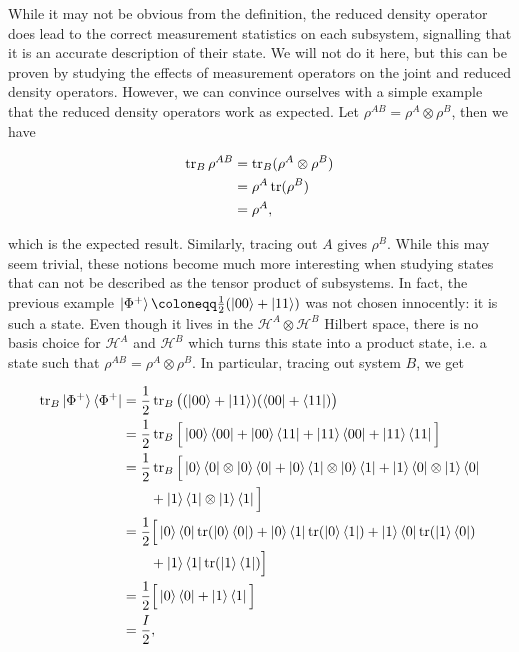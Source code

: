 While it may not be obvious from the definition, the reduced density operator does lead to the correct measurement statistics on each subsystem, signalling that it is an accurate description of their state. We will not do it here, but this can be proven by studying the effects of measurement operators on the joint and reduced density operators. However, we can convince ourselves with a simple example that the reduced density operators work as expected. Let $\rho^{AB} = \rho^A \otimes \rho^B$, then we have

\begin{align}
    \operatorname{tr}_B \rho^{AB} &= \operatorname{tr}_B (\rho^A \otimes \rho^B)\\
                    &= \rho^A \operatorname{tr}(\rho^B)\\
                    &= \rho^A,
\end{align}

\noindent which is the expected result. Similarly, tracing out $A$ gives $\rho^B$. While this may seem trivial, these notions become much more interesting when studying states that can not be described as the tensor product of subsystems. In fact, the previous example $\ket{\Phi^+} \coloneqq \frac{1}{2}(\ket{00} + \ket{11})$ was not chosen innocently: it is such a state. Even though it lives in the $\mathcal{H}^A \otimes \mathcal{H}^B$ Hilbert space, there is no basis choice for $\mathcal{H}^A$ and $\mathcal{H}^B$ which turns this state into a product state, i.e. a state such that $\rho^{AB} = \rho^A \otimes \rho^B$. In particular, tracing out system $B$, we get

\begin{align}
    \operatorname{tr}_B \ket{\Phi^+}\bra{\Phi^+} &= \frac{1}{2} \operatorname{tr}_B \big((\ket{00} + \ket{11})(\bra{00} + \bra{11})\big)\\
                                   &= \frac{1}{2} \operatorname{tr}_B \Big[\ket{00}\bra{00} + \ket{00}\bra{11} + \ket{11}\bra{00} + \ket{11}\bra{11}\Big]\\
                                   &= \frac{1}{2} \operatorname{tr}_B \Big[\ket{0}\bra{0} \otimes \ket{0}\bra{0} + \ket{0}\bra{1} \otimes \ket{0}\bra{1} + \ket{1}\bra{0} \otimes \ket{1}\bra{0}\nonumber\\
                                   &\quad \quad + \ket{1}\bra{1} \otimes \ket{1}\bra{1}\Big]\\
                                   &= \frac{1}{2} \Big[\ket{0}\bra{0}\operatorname{tr}(\ket{0}\bra{0}) + \ket{0}\bra{1}\operatorname{tr}(\ket{0}\bra{1}) + \ket{1}\bra{0}\operatorname{tr}(\ket{1}\bra{0}) \nonumber\\
                                   &\quad \quad + \ket{1}\bra{1}\operatorname{tr}(\ket{1}\bra{1})\Big]\\
                                   &= \frac{1}{2} \Big[\ket{0}\bra{0} + \ket{1}\bra{1}\Big]\\
                                   &= \frac{I}{2},
\end{align}

